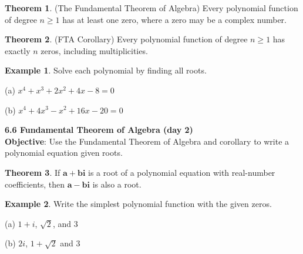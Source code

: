 \documentclass{report}
\theoremstyle{definition}
\newtheorem{example}{\bf Example}
\newtheorem{theorem}{\bf Theorem}[section]
\begin{document}
\vfill

\begin{theorem}
(The Fundamental Theorem of Algebra) Every polynomial function of degree $n \geq 1$ has at least one zero, where a zero may be a complex number.
\end{theorem}

\begin{theorem}
(FTA Corollary) Every polynomial function of degree $n\geq 1$ has exactly $n$ zeros, including multiplicities.
\end{theorem}

\begin{example}
Solve each polynomial by finding all roots.
\end{example}

\begin{minipage}[t]{0.45\linewidth}
(a) $x^4+x^3+2x^2+4x-8 = 0$
\end{minipage}
\hfill
\begin{minipage}[t]{0.45\linewidth}
(b) $x^4+4x^3-x^2+16x-20 = 0$
\end{minipage}

\vfill
\vfill
\vfill
 \noindent{}
 \newpage

\noindent\Large\textbf{6.6 Fundamental Theorem of Algebra (day 2)}\\
\noindent \hfill\small \noindent \textbf{Objective}: Use the Fundamental Theorem of Algebra and corollary to write a polynomial equation given roots. \normalsize\\

\begin{theorem}
If $\mathbf{a+bi}$ is a root of a polynomial equation with real-number coefficients, then $\mathbf{a-bi}$ is also a root.
\end{theorem}

\begin{example}
Write the simplest polynomial function with the given zeros.
\end{example}

\begin{minipage}[t]{0.45\linewidth}
(a)  $1+i$, $\sqrt{2}$, and $3$
\end{minipage}
\hfill
\begin{minipage}[t]{0.45\linewidth}
(b) $2i$, $1+\sqrt{2}$ and $3$
\end{minipage}
\end{document}
